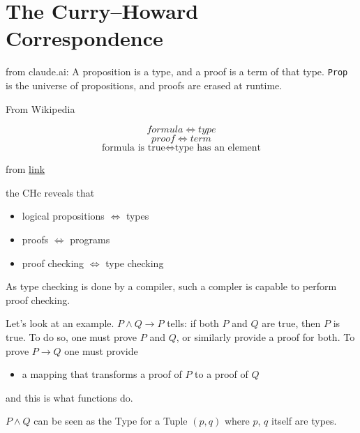 \section{The Curry–Howard Correspondence}
from claude.ai: A proposition is a type, and a proof is a term of that type. \texttt{Prop} is the universe of 
propositions, and proofs are erased at runtime.

From Wikipedia

$$ formula	\iff type $$
$$proof \iff 	term $$
$$ \text{formula is true} \iff	\text{type has an element} $$

from \href{https://dev.to/shrsv/from-logic-to-code-understanding-the-curry-howard-correspondence-in-lean-1and}{link} 

the CHc reveals that
\begin{itemize}
    \item logical propositions $\iff$ types
    \item proofs $\iff$ programs 
    \item proof checking $\iff$ type checking
\end{itemize}

As type checking is done by a compiler, such a compler is capable to 
perform proof checking. 

Let's look at an example. $P \land Q \to P$ tells: if both $P$ and $Q$ 
are true, then $P$ is true. To do so, one must prove $P$ and $Q$, or 
similarly provide a proof for both. To prove $P \to Q$ one must
provide

\begin{itemize}
    \item a mapping that transforms a proof of $P$ to a proof of $Q$
\end{itemize}

and this is what functions do.

$P \land Q$ can be seen as the Type for a Tuple $(p,q)$ where $p$, $q$ itself are types. 


